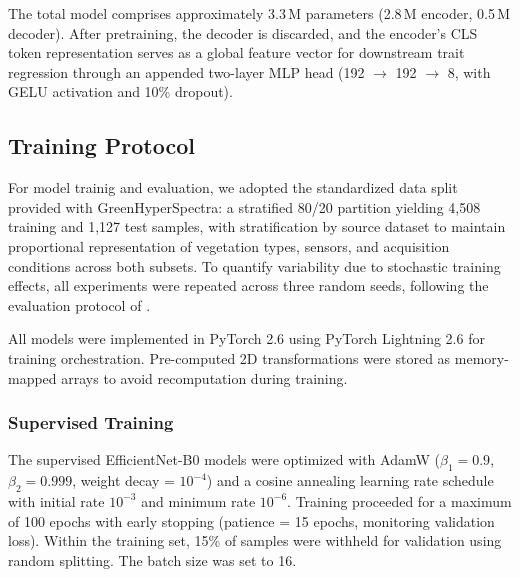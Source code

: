The total model comprises approximately 3.3\,M parameters (2.8\,M encoder, 0.5\,M decoder). After pretraining, the decoder is discarded, and the encoder's CLS token representation serves as a global feature vector for downstream trait regression through an appended two-layer MLP head (192 $\rightarrow$ 192 $\rightarrow$ 8, with GELU activation and 10\% dropout).



\subsection{Training Protocol}
\label{sec:training}

For model trainig and evaluation, we adopted the standardized data split provided with GreenHyperSpectra: a stratified 80/20 partition yielding 4,508 training and 1,127 test samples, with stratification by source dataset to maintain proportional representation of vegetation types, sensors, and acquisition conditions across both subsets. To quantify variability due to stochastic training effects, all experiments were repeated across three random seeds, following the evaluation protocol of \citet{cherif2025greenhyperspectra}.

All models were implemented in PyTorch 2.6 \citep{paszke2019pytorch} using PyTorch Lightning 2.6 for training orchestration. Pre-computed 2D transformations were stored as memory-mapped arrays to avoid recomputation during training.

\subsubsection{Supervised Training}

The supervised EfficientNet-B0 models were optimized with AdamW \citep{loshchilov2019adamw} ($\beta_1 = 0.9$, $\beta_2 = 0.999$, weight decay = $10^{-4}$) and a cosine annealing learning rate schedule with initial rate $10^{-3}$ and minimum rate $10^{-6}$. Training proceeded for a maximum of 100 epochs with early stopping (patience = 15 epochs, monitoring validation loss). Within the training set, 15\% of samples were withheld for validation using random splitting. The batch size was set to 16.


